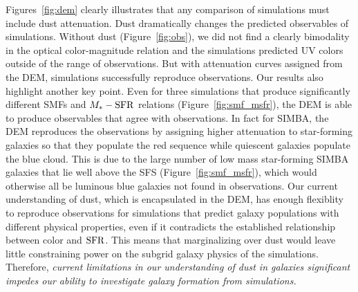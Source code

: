 Figures~\ref{fig:dem} clearly illustrates that any comparison of simulations 
must include dust attenuation. Dust dramatically changes the predicted 
observables of simulations. Without dust (Figure~\ref{fig:obs}), we did 
not find a clearly bimodality in the optical color-magnitude relation and
the simulations predicted UV colors outside of the range of observations.
But with attenuation curves assigned from the DEM, simulations successfully
reproduce observations. Our results also highlight another key point. Even for three
simulations that produce significantly different SMFs and $M_*-{\rm SFR}$ relations
(Figure~\ref{fig:smf_msfr}), the DEM is able to produce observables that agree
with observations. In fact for SIMBA, the DEM reproduces the observations by assigning
higher attenuation to star-forming galaxies so that they populate the red sequence 
while quiescent galaxies populate the blue cloud. This is due to the large
number of low mass star-forming SIMBA galaxies that lie well above the SFS
(Figure~\ref{fig:smf_msfr}), which would otherwise all be luminous blue
galaxies not found in observations. Our current understanding of dust, which is
encapsulated in the DEM, has enough flexiblity to reproduce observations 
for simulations that predict galaxy populations with different physical
properties, even if it contradicts the established relationship between color
and ${\rm SFR}$. This means that marginalizing over dust would leave little 
constraining power on the subgrid galaxy physics of the simulations. 
Therefore, \emph{current limitations in our understanding of dust in 
galaxies significant impedes our ability to investigate galaxy 
formation from simulations.}


